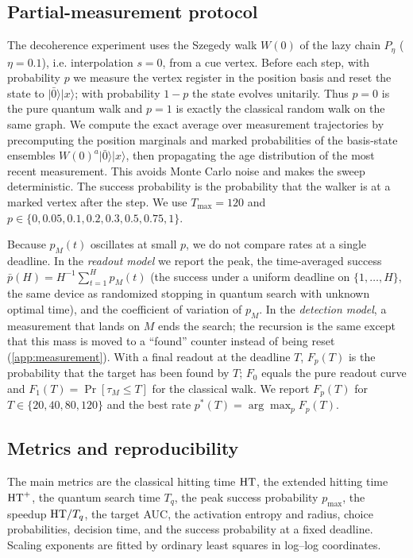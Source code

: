 \subsection{Partial-measurement protocol}
\label{sec:methods-noise}

The decoherence experiment uses the Szegedy walk $W(0)$ of the lazy chain $P_\eta$ ($\eta=0.1$), i.e.
interpolation $s=0$, from a cue
vertex. Before each step, with probability $p$ we measure the vertex register
in the position basis and reset the state to
$\lvert\bar 0\rangle\lvert x\rangle$; with probability $1-p$ the state evolves
unitarily. Thus $p=0$ is the pure quantum walk and $p=1$ is exactly the
classical random walk on the same graph. We compute the exact average over
measurement trajectories by precomputing the position marginals and marked
probabilities of the basis-state ensembles
$W(0)^a\lvert\bar 0\rangle\lvert x\rangle$, then propagating the age
distribution of the most recent measurement. This avoids Monte Carlo noise and
makes the sweep deterministic. The success probability is the probability that
the walker is at a marked vertex after the step. We use $T_{\max}=120$ and
$p\in\{0,0.05,0.1,0.2,0.3,0.5,0.75,1\}$.

Because $p_M(t)$ oscillates at small $p$, we do not compare rates at a single
deadline. In the \emph{readout model} we report the peak, the time-averaged
success $\bar p(H)=H^{-1}\sum_{t=1}^{H}p_M(t)$ (the success under a uniform
deadline on $\{1,\dots,H\}$, the same device as randomized stopping in quantum
search with unknown optimal time), and the coefficient of variation of $p_M$.
In the \emph{detection model}, a measurement that lands on $M$ ends the search;
the recursion is the same except that this mass is moved to a ``found''
counter instead of being reset (\cref{app:measurement}). With a final readout
at the deadline $T$, $F_p(T)$ is the probability that the target has been found
by $T$; $F_0$ equals the pure readout curve and $F_1(T)=\Pr[\tau_M\le T]$ for
the classical walk. We report $F_p(T)$ for $T\in\{20,40,80,120\}$ and the best
rate $p^\ast(T)=\arg\max_pF_p(T)$.

\subsection{Metrics and reproducibility}
\label{sec:methods-reproducibility}

The main metrics are the classical hitting time $\mathrm{HT}$, the extended hitting
time $\mathrm{HT}^+$, the quantum search time $T_q$, the peak success probability
$p_{\max}$, the speedup $\mathrm{HT}/T_q$, the target AUC, the activation entropy and
radius, choice probabilities, decision time, and the success probability at a
fixed deadline. Scaling exponents are fitted by ordinary least squares in
log--log coordinates.

